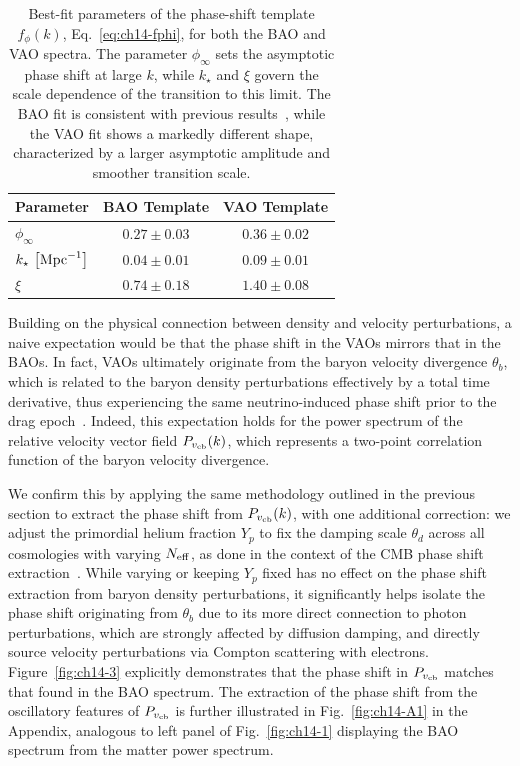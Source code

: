 \begin{table}
	\centering
	\begin{tabular}{l c @{\hskip 1em} c}
			\toprule
		Parameter 				& {BAO Template} & 							{VAO Template}								\\
			\midrule[0.065em]
		$\phi_\infty$ 				& $0.27 \pm 0.03$ & $0.36 \pm 0.02$				 		\\
		$k_\star\,\left[\rm{Mpc}^{-1}\right]$				& $0.04 \pm 0.01$ &	 $0.09 \pm 0.01$				\\
		$\xi$ 		& $0.74\pm 0.18$ & $1.40\pm 0.08$ \\

			\bottomrule
	\end{tabular}
	\caption[Best-fit parameters of the BAO and VAO phase-shift templates]{Best-fit parameters of the phase-shift template $f_\phi(k)$, Eq.~\eqref{eq:ch14-fphi}, for both the BAO and VAO spectra. The parameter $\phi_\infty$ sets the asymptotic phase shift at large $k$, while $k_\star$ and $\xi$ govern the scale dependence of the transition to this limit. The BAO fit is consistent with previous results~\cite{Baumann:2017gkg}, while the VAO fit shows a markedly different shape, characterized by a larger asymptotic amplitude and smoother transition scale.}
\label{tab:ch14-phase_templates}
\end{table}


\noindent Building on the physical connection between density and velocity perturbations, a naive expectation would be that the phase shift in the VAOs mirrors that in the BAOs. In fact, VAOs ultimately originate from the baryon velocity divergence $\theta_b$, which is related to the baryon density perturbations effectively by a total time derivative, thus experiencing the same neutrino-induced phase shift prior to the drag epoch~\cite{Green:2020fjb, Montefalcone:2025unv}. Indeed, this expectation holds for the power spectrum of the relative velocity vector field $P_{v_{\rm cb}}(k)$, which represents a two-point correlation function of the baryon velocity divergence.

We confirm this by applying the same methodology outlined in the previous section to extract the phase shift from $P_{v_{\rm cb}}(k)$, with one additional correction: we adjust the primordial helium fraction $Y_p$ to fix the damping scale $\theta_d$ across all cosmologies with varying $N_{\rm eff}$, as done in the context of the CMB phase shift extraction~\cite{Follin:2015hya, Montefalcone:2025unv}. While varying or keeping $Y_p$ fixed has no effect on the phase shift extraction from baryon density perturbations, it significantly helps isolate the phase shift originating from $\theta_b$ due to its more direct connection to photon perturbations, which are strongly affected by diffusion damping, and directly source velocity perturbations via Compton scattering with electrons. Figure~\ref{fig:ch14-3} explicitly demonstrates that the phase shift in $P_{v_{\rm cb}}$ matches that found in the BAO spectrum. The extraction of the phase shift from the oscillatory features of $P_{v_{\rm cb}}$ is further illustrated in Fig.~\ref{fig:ch14-A1} in the Appendix, analogous to left panel of Fig.~\ref{fig:ch14-1} displaying the BAO spectrum from the matter power spectrum.

